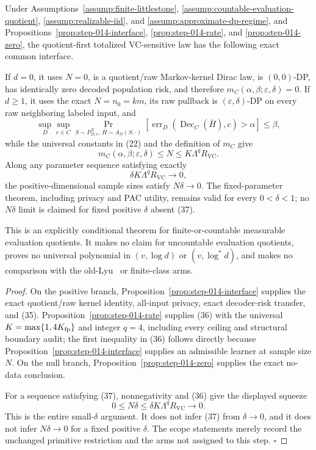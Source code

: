 \begin{proposition}\label{prop:step-014-vc-arm}
Under Assumptions~\ref{assump:finite-littlestone},
\ref{assump:countable-evaluation-quotient},
\ref{assump:realizable-iid}, and
\ref{assump:approximate-dp-regime}, and
Propositions~\ref{prop:step-014-interface},
\ref{prop:step-014-rate}, and
\ref{prop:step-014-zero}, the quotient-first totalized VC-sensitive law has
the following exact common interface.

If \(d=0\), it uses \(N=0\), is a quotient/raw Markov-kernel Dirac law, is
\((0,0)\)-DP, has identically zero decoded population risk, and therefore
\(m_C(\alpha,\beta;\varepsilon,\delta)=0\). If
\(d\geq1\), it uses the exact  \(N=n_0=km\), its raw pullback is
\((\varepsilon,\delta)\)-DP on every raw neighboring labeled input, and
\[
\sup_D\sup_{c\in C}
\Pr_{S\sim P_{D,c}^N,\,\bar H\sim A_N(S,\cdot)}
\left[
\operatorname{err}_D(\operatorname{Dec}_C(\bar H),c)>\alpha
\right]
\leq\beta,
\tag{35}
\]
while the universal constants in (22) and the definition of \(m_C\) give
\[
 m_C(\alpha,\beta;\varepsilon,\delta)
 \leq N\leq K\Lambda^qR_{\mathrm{VC}}.
\tag{36}
\]
Along any parameter sequence satisfying exactly
\[
 \delta K\Lambda^qR_{\mathrm{VC}}\longrightarrow0,
\tag{37}
\]
the positive-dimensional sample sizes satisfy \(N\delta\to0\). The
fixed-parameter theorem, including privacy and PAC utility, remains valid
for every \(0<\delta<1\); no \(N\delta\) limit is claimed for fixed positive
\(\delta\) absent (37).

This is an explicitly conditional theorem for finite-or-countable
measurable evaluation quotients. It makes no claim for uncountable
evaluation quotients, proves no universal polynomial in
\((v,\log d)\) or \((v,\log^*d)\), and makes no comparison with the old-Lyu~\citep{lyu2025}
or finite-class arms.


\end{proposition}

\begin{proof}
On the positive branch,
Proposition~\ref{prop:step-014-interface} supplies the exact quotient/raw
kernel identity, all-input privacy, exact decoder-risk transfer, and (35).
Proposition~\ref{prop:step-014-rate} supplies (36) with the universal
\(K=\max\{1,4K_{\rm fp}\}\) and integer \(q=4\), including every ceiling
and structural boundary audit; the first inequality in (36) follows
directly because Proposition~\ref{prop:step-014-interface} supplies an
admissible learner at sample size \(N\). On the null branch,
Proposition~\ref{prop:step-014-zero} supplies the exact no-data conclusion.

For a sequence satisfying (37), nonnegativity and (36) give the displayed
squeeze
\[
 0\leq N\delta
 \leq\delta K\Lambda^qR_{\mathrm{VC}}
 \longrightarrow0.
\tag{38}
\]
This is the entire small-\(\delta\) argument. It does not infer (37) from
\(\delta\to0\), and it does not infer \(N\delta\to0\) for a fixed positive
\(\delta\). The scope statements merely record the unchanged primitive
restriction and the arms not assigned to this step. \(\square\)


\end{proof}

